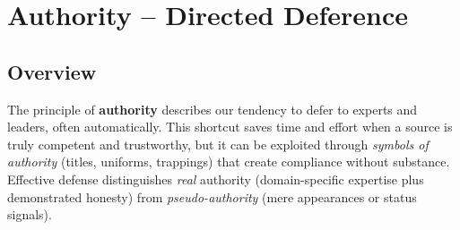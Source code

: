 \section{Authority – Directed Deference}

\subsection*{Overview}
The principle of \textbf{authority} describes our tendency to defer to experts and leaders, often automatically. This shortcut saves time and effort when a source is truly competent and trustworthy, but it can be exploited through \emph{symbols of authority} (titles, uniforms, trappings) that create compliance without substance. Effective defense distinguishes \emph{real} authority (domain-specific expertise plus demonstrated honesty) from \emph{pseudo-authority} (mere appearances or status signals).


